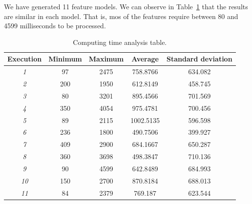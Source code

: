 We have generated 11 feature models. We can observe in
Table~\ref{execution_times} that the results are similar in each
model. That is, mos of  the features require between 80 and 4599 milliseconds to be processed.

\begin{table}[h]
        \centering
        \begin{tabular}{|c|c|c|c|c|}
                \hline
                \textbf{Execution} & \textbf{Minimum} &  \textbf{Maximum} &  \textbf{Average} &  \textbf{Standard deviation} \\ \hline
                \textit{1}              & 97   & 2475  & 758.8766  & 634.082        \\ \hline
                \textit{2}              & 200  & 1950  & 612.8149  & 458.745        \\ \hline
                \textit{3}              & 80   & 3201  & 895.4566  & 701.569        \\ \hline
                \textit{4}              & 350  & 4054  & 975.4781  & 700.456        \\ \hline
                \textit{5}              & 89   & 2115  & 1002.5135 & 596.598        \\ \hline
                \textit{6}              & 236  & 1800  & 490.7506  & 399.927        \\ \hline
                \textit{7}              & 409  & 2900  & 684.1667  & 650.287        \\ \hline
                \textit{8}              & 360  & 3698  & 498.3847  & 710.136        \\ \hline
                \textit{9}              & 90   & 4599  & 642.8489  & 684.993        \\ \hline
                \textit{10}             & 150  & 2700  & 870.8184  & 688.013        \\ \hline
                \textit{11}             & 84   & 2379  & 769.187   & 623.544        \\ \hline
        \end{tabular}
        \caption{Computing time analysis table.}
        \label{execution_times}
\end{table}

